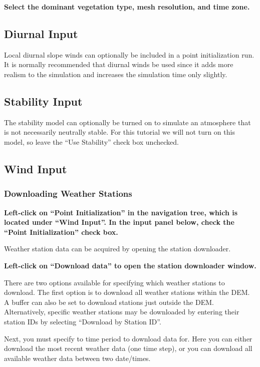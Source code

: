 \documentclass[12pt]{article}
\begin{document}
\textbf{\color{red}Select the dominant vegetation type, mesh resolution, and time zone.}

\subsection{Diurnal Input}
Local diurnal slope winds can optionally be included in a point initialization run.  It is normally recommended that diurnal winds be used since it adds more realism to the simulation and increases the simulation time only slightly.

\subsection{Stability Input}

The stability model can optionally be turned on to simulate an atmosphere that is not necessarily neutrally stable.  For this tutorial we will not turn on this model, so leave the “Use Stability” check box unchecked.

\subsection{Wind Input}
\subsubsection{Downloading Weather Stations}

\textbf{\color{red} Left-click on “Point Initialization” in the navigation tree, which is located under “Wind Input”.  In the input panel below, check the “Point Initialization” check box.}

Weather station data can be acquired by opening the station downloader.

\textbf{\color{red}Left-click on “Download data” to open the station downloader window.}

There are two options available for specifying which weather stations to download. The first option is to download all weather stations within the DEM. A buffer can also be set to download stations just outside the DEM. Alternatively, specific weather stations may be downloaded by entering their station IDs by selecting “Download by Station ID”.

Next, you must specify to time period to download data for.  Here you can either download the most recent weather data (one time step), or you can download all available weather data between two date/times.
\end{document}
